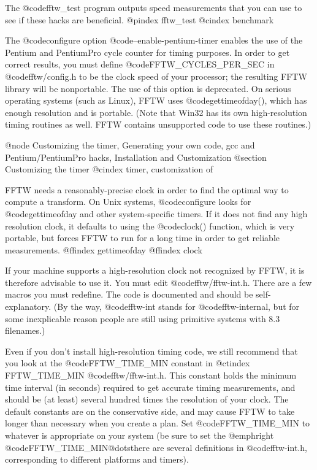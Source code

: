 The @code{fftw_test} program outputs speed measurements that you can use
to see if these hacks are beneficial.
@pindex fftw_test
@cindex benchmark

The @code{configure} option @code{--enable-pentium-timer} enables the
use of the Pentium and PentiumPro cycle counter for timing purposes.  In
order to get correct results, you must define @code{FFTW_CYCLES_PER_SEC}
in @code{fftw/config.h} to be the clock speed of your processor; the
resulting FFTW library will be nonportable.  The use of this option is
deprecated.  On serious operating systems (such as Linux), FFTW uses
@code{gettimeofday()}, which has enough resolution and is portable.
(Note that Win32 has its own high-resolution timing routines as well.
FFTW contains unsupported code to use these routines.)

@node Customizing the timer, Generating your own code, gcc and Pentium/PentiumPro hacks, Installation and Customization
@section Customizing the timer
@cindex timer, customization of

FFTW needs a reasonably-precise clock in order to find the optimal way
to compute a transform.  On Unix systems, @code{configure} looks for
@code{gettimeofday} and other system-specific timers.  If it does not
find any high resolution clock, it defaults to using the @code{clock()}
function, which is very portable, but forces FFTW to run for a long time
in order to get reliable measurements.
@ffindex gettimeofday
@ffindex clock

If your machine supports a high-resolution clock not recognized by FFTW,
it is therefore advisable to use it.  You must edit
@code{fftw/fftw-int.h}.  There are a few macros you must redefine.  The
code is documented and should be self-explanatory.  (By the way,
@code{fftw-int} stands for @code{fftw-internal}, but for some
inexplicable reason people are still using primitive systems with 8.3
filenames.)

Even if you don't install high-resolution timing code, we still
recommend that you look at the @code{FFTW_TIME_MIN} constant in
@ctindex FFTW_TIME_MIN
@code{fftw/fftw-int.h}. This constant holds the minimum time interval (in
seconds) required to get accurate timing measurements, and should be (at
least) several hundred times the resolution of your clock.  The default
constants are on the conservative side, and may cause FFTW to take
longer than necessary when you create a plan. Set @code{FFTW_TIME_MIN}
to whatever is appropriate on your system (be sure to set the
@emph{right} @code{FFTW_TIME_MIN}@dots{}there are several definitions in
@code{fftw-int.h}, corresponding to different platforms and timers).

